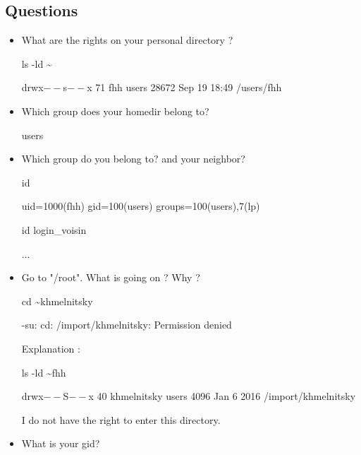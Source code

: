 \documentclass[11pt]{article}
\begin{document}
\subsection{Questions}

\begin{itemize}
 \item What are the rights on your personal directory ?
\begin{solution}

ls -ld \textasciitilde{}

drwx$--$s$--$x 71 fhh users 28672 Sep 19 18:49 /users/fhh

\end{solution}
 \item Which group does your homedir belong to?
\begin{solution}
users
\end{solution}
 \item Which group do you belong to? and your neighbor?
 \begin{solution}
id

uid=1000(fhh) gid=100(users) groups=100(users),7(lp)

id login\_voisin

...

\end{solution}
 \item Go to "/root". What is going on ? Why ?
\begin{solution}

cd \textasciitilde{}khmelnitsky

-su: cd: /import/khmelnitsky: Permission denied

Explanation :

ls -ld \textasciitilde{}fhh

drwx$--$S$--$x 40 khmelnitsky users 4096 Jan  6  2016 /import/khmelnitsky

I do not have the right to enter this directory.
\end{solution}
 \item What is your gid?
\begin{solution}


\end{solution}
\end{itemize}
\end{document}
